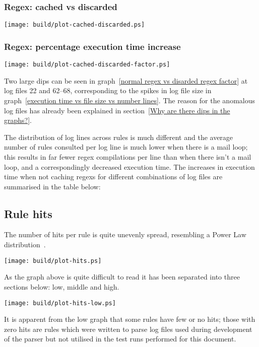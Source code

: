 \documentclass[a4paper,12pt,draft]{article}
\begin{document}
\subsubsection{Regex: cached vs discarded}
\label{normal regex vs discard regex}
\texttt{[image: build/plot-cached-discarded.ps]}

\subsubsection{Regex: percentage execution time increase}
\label{normal regex vs disarded regex factor}
\texttt{[image: build/plot-cached-discarded-factor.ps]}

Two large dips can be seen in graph~\ref{normal regex vs disarded regex
factor} at log files 22 and 62--68, corresponding to the spikes in log file
size in graph~\ref{execution time vs file size vs number lines}.  The
reason for the anomalous log files has already been explained in
section~\ref{Why are there dips in the graphs?}.

The distribution of log lines across rules is much different and the
average number of rules consulted per log line is much lower when there is
a mail loop; this results in far fewer regex compilations per line than
when there isn't a mail loop, and a correspondingly decreased execution
time.  The increases in execution time when not caching regexs for
different combinations of log files are summarised in the table below:




\subsection{Rule hits}
\label{rule hits}

The number of hits per rule is quite unevenly spread, resembling a Power
Law distribution~\cite{powerlaw}.

\noindent\texttt{[image: build/plot-hits.ps]}

As the graph above is quite difficult to read it has been separated into
three sections below: low, middle and high.

\noindent\texttt{[image: build/plot-hits-low.ps]}

It is apparent from the low graph that some rules have few or no hits;
those with zero hits are rules which were written to parse log files used
during development of the parser but not utilised in the test runs
performed for this document.
\end{document}
